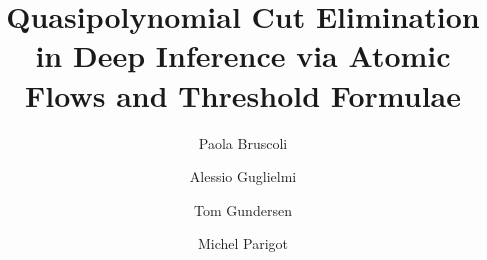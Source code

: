 \documentclass[envcountsame,envcountreset]{llncs}
\begin{document}
\author{Paola Bruscoli \and Alessio Guglielmi \and Tom Gundersen \and Michel Parigot}
\title{	Quasipolynomial Cut Elimination in Deep Inference via Atomic Flows and Threshold Formulae}


\maketitle









\small

\end{document}
